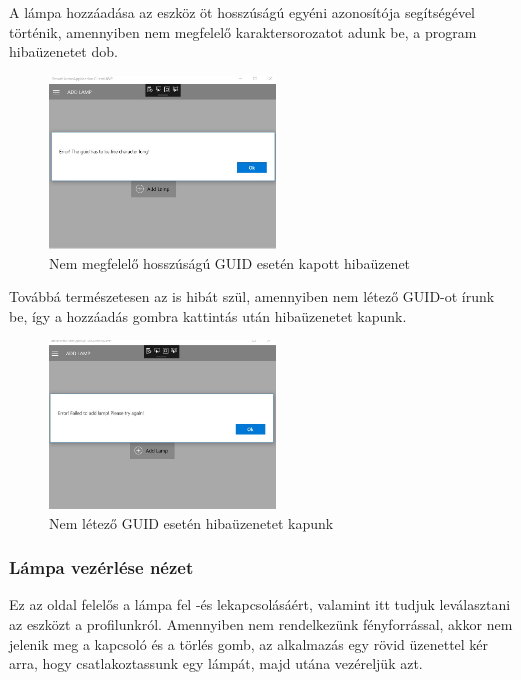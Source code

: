 \documentclass[a4paper,12pt]{report}
\begin{document}
    A lámpa hozzáadása az eszköz öt hosszúságú egyéni azonosítója segítségével történik, amennyiben nem megfelelő karaktersorozatot
    adunk be, a program hibaüzenetet dob.

\begin{figure}[H]
    \centering
    \includegraphics[width=6cm]{images/fivecharacter.jpg}
    \caption{Nem megfelelő hosszúságú GUID esetén kapott hibaüzenet}
    \label{fig: FiveCharacter}
\end{figure}

    Továbbá természetesen az is hibát szül, amennyiben nem létező GUID-ot írunk be, így a hozzáadás gombra kattintás után
    hibaüzenetet kapunk.

\begin{figure}[H]
    \centering
    \includegraphics[width=6cm]{images/addfail.jpg}
    \caption{Nem létező GUID esetén hibaüzenetet kapunk}
    \label{fig: InvalidGuid}
\end{figure}

\subsubsection{Lámpa vezérlése nézet}
    Ez az oldal felelős a lámpa fel -és lekapcsolásáért, valamint itt tudjuk leválasztani az eszközt a profilunkról. Amennyiben
    nem rendelkezünk fényforrással, akkor nem jelenik meg a kapcsoló és a törlés gomb, az alkalmazás egy rövid üzenettel kér
    arra, hogy csatlakoztassunk egy lámpát, majd utána vezéreljük azt.
\end{document}
